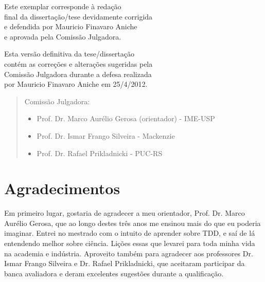 \documentclass[11pt,openany,twoside,a4paper]{book}
\begin{document}
    \vskip 2cm

    \begin{flushright}
     Este exemplar corresponde à redação\\
     final da dissertação/tese devidamente corrigida\\
     e defendida por Mauricio Finavaro Aniche\\
     e aprovada pela Comissão Julgadora.
    
	Esta versão definitiva da tese/dissertação\\
	contém as correções e alterações sugeridas pela\\
	Comissão Julgadora durante a defesa realizada\\
    por Mauricio Finavaro Aniche em 25/4/2012.

    \vskip 2cm

    \end{flushright}
    \vskip 4.2cm

    \begin{quote}
    \noindent Comissão Julgadora:
    
    \begin{itemize}
		\item Prof. Dr. Marco Aurélio Gerosa (orientador) - IME-USP
		\item Prof. Dr. Ismar Frango Silveira - Mackenzie
		\item Prof. Dr. Rafael Prikladnicki - PUC-RS
    \end{itemize}
      
    \end{quote}
\pagebreak


\chapter*{Agradecimentos}

Em primeiro lugar, gostaria de agradecer a meu orientador, Prof. Dr. Marco Aurélio
Gerosa, que ao longo destes três anos me ensinou mais do que eu poderia imaginar.
Entrei no mestrado com o intuito de aprender sobre TDD, e saí de lá entendendo
melhor sobre ciência. Lições essas que levarei para toda minha vida na academia e indústria.
Aproveito também para agradecer aos professores Dr. Ismar Frango Silveira e Dr. Rafael
Prikladnicki, que aceitaram participar da banca avaliadora
e deram excelentes sugestões durante a qualificação.
\end{document}
